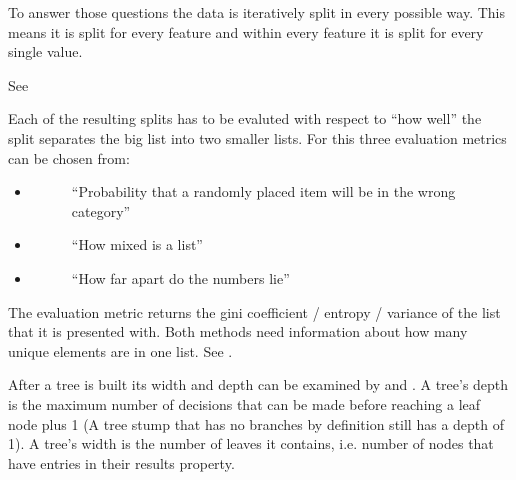 \documentclass[letterpaper,10pt,english]{sphinxmanual}
\begin{document}
To answer those questions the data is iteratively split in every possible way.
This means it is split for every feature and within every feature it is split for every single value.

See {\hyperref[\detokenize{DT:divideset}]{}}

Each of the resulting splits has to be evaluted with respect to ``how well'' the split separates the big list into two smaller lists.
For this three evaluation metrics can be chosen from:
\begin{itemize}
\item {} \begin{description}
\item[{{\hyperref[\detokenize{DT:giniimpurity}]{}}}] \leavevmode
``Probability that a randomly placed item will be in the wrong category''

\end{description}

\item {} \begin{description}
\item[{{\hyperref[\detokenize{DT:entropy}]{}}}] \leavevmode
``How mixed is a list''

\end{description}

\item {} \begin{description}
\item[{{\hyperref[\detokenize{DT:variance}]{}}}] \leavevmode
``How far apart do the numbers lie''

\end{description}

\end{itemize}

The evaluation metric returns the gini coefficient / entropy / variance of the list that it is presented with.
Both methods need information about how many unique elements are in one list.
See {\hyperref[\detokenize{DT:uniquecounts}]{}}.

After a tree is built its width and depth can be examined by {\hyperref[\detokenize{DT:getdepth}]{}} and {\hyperref[\detokenize{DT:getwidth}]{}}.
A tree's depth is the maximum number of decisions that can be made before reaching a leaf node plus 1 (A tree stump that has no branches by definition still has a depth of 1).
A tree's width is the number of leaves it contains, i.e. number of nodes that have entries in their results property.
\end{document}
